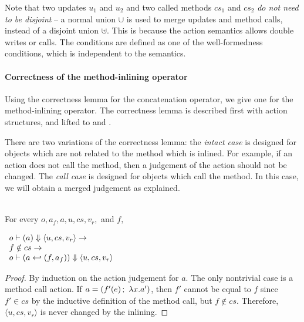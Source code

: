 Note that two updates $u_1$ and $u_2$ and two called methods $cs_1$
and $cs_2$ \emph{do not need to be disjoint} -- a normal union $\cup$
is used to merge updates and method calls, instead of a disjoint union
$\uplus$. This is because the action semantics allows double writes or
calls. The conditions are defined as one of the well-formedness
conditions, which is independent to the semantics.

\paragraph{Correctness of the method-inlining operator}

Using the correctness lemma for the concatenation operator, we give
one for the method-inlining operator. The correctness lemma is
described first with action structures, and lifted to \Substep{} and
\Substeps{}.

There are two variations of the correctness lemma: the \emph{intact
  case} is designed for objects which are not related to the method
which is inlined. For example, if an action does not call the method,
then a judgement of the action should not be changed. The \emph{call
  case} is designed for objects which call the method. In this case,
we will obtain a merged judgement as explained.

\begin{lemma}
  \label{lem-inlinedm-action-intact}
  \mbox{}\\
  For every $o, a_f, a, u, cs, v_r,$ and $f,$
  \begin{center}
    \begin{math}
      \begin{array}{l}
        \semact{o}{a}{u}{cs}{v_r} \to \\
        f \notin cs \to \\
        \semact{o}{\inlinedm{a}{(f, a_f)}}{u}{cs}{v_r}
      \end{array}
    \end{math}
  \end{center}
\end{lemma}
\begin{proof}
  By induction on the action judgement for $a$. The only nontrivial
  case is a method call action. If $a = (\actcall{x}{f'}{e}{a'})$,
  then $f'$ cannot be equal to $f$ since $f' \in cs$ by the inductive
  definition of the method call, but $f \notin cs$. Therefore,
  $\langle u, cs, v_r \rangle$ is never changed by the inlining.
\end{proof}

